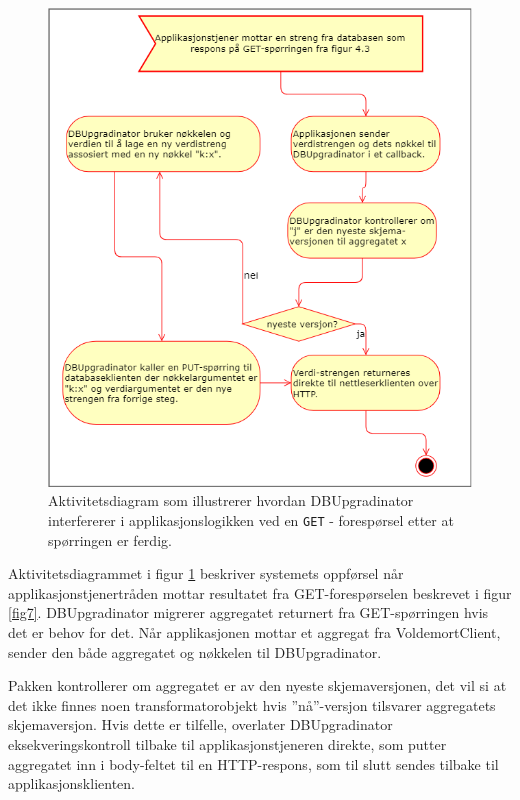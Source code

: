 \begin{figure}[hbtp]
  \centering
  \includegraphics[scale=0.6]{fig/dbupgradinator-prosess-2.png}
  \caption{Aktivitetsdiagram som illustrerer hvordan DBUpgradinator interfererer i applikasjonslogikken ved en \texttt{GET} - forespørsel etter at spørringen er ferdig.}
  \label{fig8}
\end{figure}

Aktivitetsdiagrammet i figur \ref{fig8} beskriver systemets oppførsel når applikasjons\-tjener\-tråden mottar resultatet fra GET-forespørselen beskrevet i figur \ref{fig7}. DBUpgradinator migrerer aggregatet returnert fra GET-spørringen hvis det er behov for det. Når applikasjonen mottar et aggregat fra VoldemortClient, sender den både aggregatet og nøkkelen til DBUpgradinator.

Pakken kontrollerer om aggregatet er av den nyeste skjemaversjonen, det vil si at det ikke finnes noen transformatorobjekt hvis ''nå''-versjon tilsvarer aggregatets skjemaversjon. Hvis dette er tilfelle, overlater DBUpgradinator eksekveringskontroll tilbake til applikasjonstjeneren direkte, som putter aggregatet inn i body-feltet til en HTTP-respons, som til slutt sendes tilbake til applikasjonsklienten.


